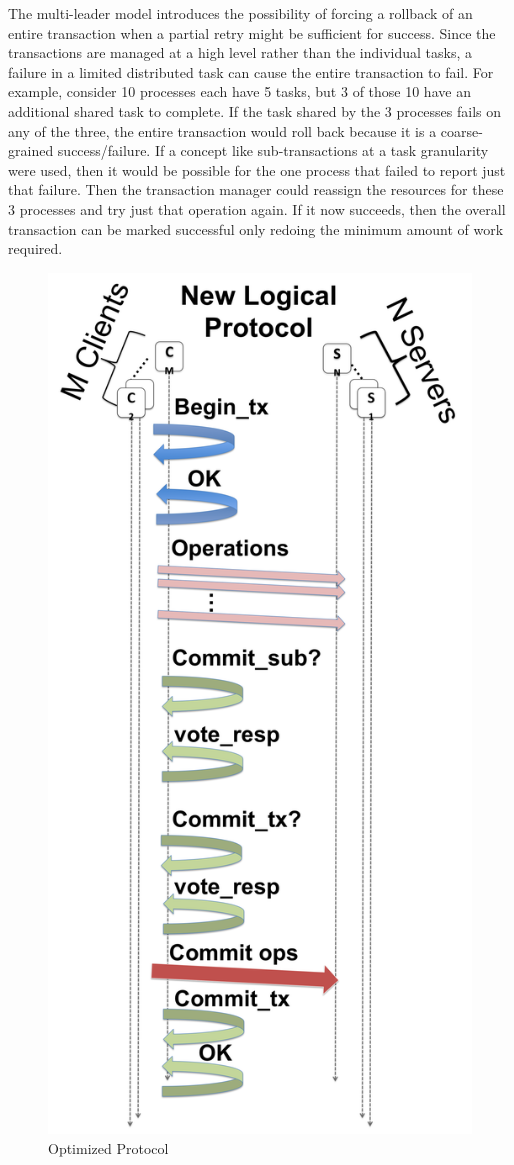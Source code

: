 \documentclass[conference]{IEEEtran}
\begin{document}
The multi-leader model introduces the possibility of forcing a rollback of an
entire transaction when a partial retry might be sufficient for success. Since
the transactions are managed at a high level rather than the individual
tasks, a failure in a limited distributed task can cause the entire transaction
to fail. For example, consider 10 processes each have 5 tasks, but 3 of those
10 have an additional shared task to complete. If the task shared by the 3
processes fails on any of the three, the entire transaction would roll back
because it is a coarse-grained success/failure. If a concept like
sub-transactions at a task granularity were used, then it would be possible for
the one process that failed to report just that failure. Then the transaction
manager could reassign the resources for these 3 processes and try just that
operation again. If it now succeeds, then the overall transaction can be marked
successful only redoing the minimum amount of work required.

\begin{figure}[ht]
\centering
\includegraphics[keepaspectratio=true, width=0.8\columnwidth]{images/optimized-protocol}
\caption{Optimized Protocol}
\label{fig:optimized-protocol}
\end{figure}
\end{document}
